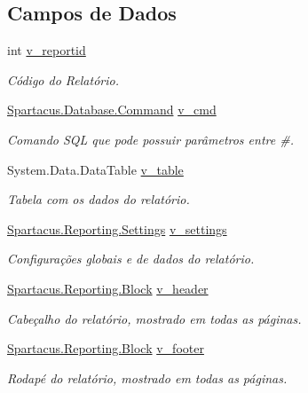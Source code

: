\subsection*{Campos de Dados}
\begin{DoxyCompactItemize}
\item 
int \hyperlink{classSpartacus_1_1Reporting_1_1Report_a852ec5a1b9aaa894595e594cd33d5e09}{v\+\_\+reportid}
\begin{DoxyCompactList}\small\item\em Código do Relatório. \end{DoxyCompactList}\item 
\hyperlink{classSpartacus_1_1Database_1_1Command}{Spartacus.\+Database.\+Command} \hyperlink{classSpartacus_1_1Reporting_1_1Report_a35359a3acb53db8d3265e3d6497124f2}{v\+\_\+cmd}
\begin{DoxyCompactList}\small\item\em Comando S\+Q\+L que pode possuir parâmetros entre \#. \end{DoxyCompactList}\item 
System.\+Data.\+Data\+Table \hyperlink{classSpartacus_1_1Reporting_1_1Report_a84089fdf49d60ce315a718f89a47c8b2}{v\+\_\+table}
\begin{DoxyCompactList}\small\item\em Tabela com os dados do relatório. \end{DoxyCompactList}\item 
\hyperlink{classSpartacus_1_1Reporting_1_1Settings}{Spartacus.\+Reporting.\+Settings} \hyperlink{classSpartacus_1_1Reporting_1_1Report_a13e0785868400d716ccce1d34cd786f1}{v\+\_\+settings}
\begin{DoxyCompactList}\small\item\em Configurações globais e de dados do relatório. \end{DoxyCompactList}\item 
\hyperlink{classSpartacus_1_1Reporting_1_1Block}{Spartacus.\+Reporting.\+Block} \hyperlink{classSpartacus_1_1Reporting_1_1Report_a714fe9a95697a7bb0aef46cd2be55719}{v\+\_\+header}
\begin{DoxyCompactList}\small\item\em Cabeçalho do relatório, mostrado em todas as páginas. \end{DoxyCompactList}\item 
\hyperlink{classSpartacus_1_1Reporting_1_1Block}{Spartacus.\+Reporting.\+Block} \hyperlink{classSpartacus_1_1Reporting_1_1Report_ac5b8fc2e637f71f965ef27fbdbdd9acf}{v\+\_\+footer}
\begin{DoxyCompactList}\small\item\em Rodapé do relatório, mostrado em todas as páginas. \end{DoxyCompactList}\item 

\end{DoxyCompactItemize}
